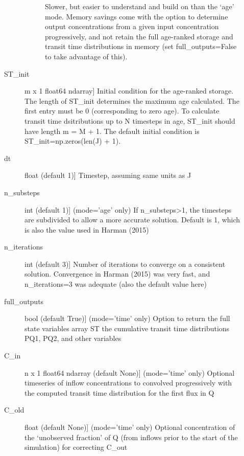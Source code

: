 \documentclass[letterpaper,10pt,english]{sphinxmanual}
\begin{document}
\begin{fulllineitems}
\begin{description}
\begin{description}
\begin{description}
\item[{}] \leavevmode
Slower, but easier to understand and build on than the `age' mode.
Memory savings come with the option to determine output concentrations
from a given input concentration progressively, and not retain the full
age-ranked storage and transit time distributions in memory (set
full\_outputs=False to take advantage of this).

\end{description}

\item[{ST\_init}] \leavevmode{[}m x 1 float64 ndarray{]}
Initial condition for the age-ranked storage. The length of ST\_init
determines the maximum age calculated. The first entry must be 0
(corresponding to zero age). To calculate transit time dsitributions up
to N timesteps in age, ST\_init should have length m = M + 1. The default
initial condition is ST\_init=np.zeros(len(J) + 1).

\item[{dt}] \leavevmode{[}float (default 1){]}
Timestep, assuming same units as J

\item[{n\_substeps}] \leavevmode{[}int (default 1){]}
(mode='age' only) If n\_substeps\textgreater{}1, the timesteps are subdivided to allow a more accurate
solution. Default is 1, which is also the value used in Harman (2015)

\item[{n\_iterations}] \leavevmode{[}int (default 3){]}
Number of iterations to converge on a consistent solution. Convergence 
in Harman (2015) was very fast, and n\_iterations=3 was adequate (also 
the default value here)

\item[{full\_outputs}] \leavevmode{[}bool (default True){]}
(mode='time' only) Option to return the full state variables array ST the cumulative
transit time distributions PQ1, PQ2, and other variables

\item[{C\_in}] \leavevmode{[}n x 1 float64 ndarray (default None){]}
(mode='time' only) Optional timeseries of inflow concentrations to convolved progressively
with the computed transit time distribution for the first flux in Q

\item[{C\_old}] \leavevmode{[}float (default None){]}
(mode='time' only) Optional concentration of the `unobserved fraction' of Q (from inflows 
prior to the start of the simulation) for correcting C\_out


\end{description}
\end{description}
\end{fulllineitems}
\end{document}
